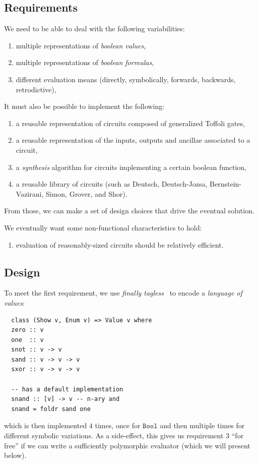 \documentclass[sigplan,screen]{acmart}
\theoremstyle{definition}
\begin{document}
\subsection{Requirements}

We need to be able to deal with the following variabilities:
\begin{enumerate}
  \item multiple representations of \emph{boolean values},
  \item multiple representations of \emph{boolean formulas},
  \item different evaluation means (directly, symbolically, forwards,
    backwards, retrodictive),
\end{enumerate}

\noindent It must also be possible to implement the following:
\begin{enumerate}[resume]
  \item a reusable representation of circuits composed of generalized Toffoli gates,
  \item a reusable representation of the inputs, outputs and ancillae associated to
    a circuit,
  \item a \emph{synthesis} algorithm for circuits implementing a certain boolean
    function,
  \item a reusable library of circuits (such as
    Deutsch, Deutsch-Jozsa, Bernstein-Vazirani, Simon, Grover, and Shor).
\end{enumerate}
\noindent From those, we can make a
set of design choices that drive the eventual solution.

We eventually want some non-functional characteristics to hold:
\begin{enumerate}[resume]
  \item evaluation of reasonably-sized circuits should be relatively efficient.
\end{enumerate}

\subsection{Design}

To meet the first requirement, we use \emph{finally tagless}~\cite{tagless}
to encode a \emph{language of values}:
\begin{verbatim}
  class (Show v, Enum v) => Value v where
  zero :: v
  one  :: v
  snot :: v -> v
  sand :: v -> v -> v
  sxor :: v -> v -> v

  -- has a default implementation
  snand :: [v] -> v -- n-ary and
  snand = foldr sand one
\end{verbatim}
\noindent which is then implemented $4$ times, once for $\texttt{Bool}$
and then multiple times for different symbolic variations. As a side-effect,
this gives us requirement $3$ ``for free'' if we can write a sufficiently
polymorphic evaluator (which we will present below).
\end{document}
